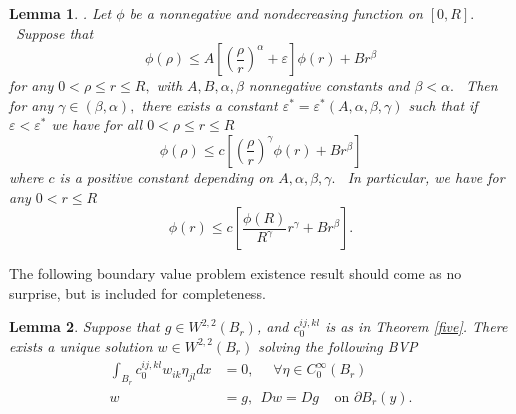 \documentclass[12pt,leqno]{amsart}%
\theoremstyle{plain}
\newtheorem{lemma}{Lemma}[section]
\numberwithin{equation}{section}
\theoremstyle{definition}
\begin{document}
\medskip

\begin{lemma}
\label{HanLin} \cite[Lemma 3.4]{HanLin}. Let $\phi$ be a nonnegative and
nondecreasing function on $[0,R].$ \ Suppose that
\[
\phi(\rho)\leq A\left[  \left(  \frac{\rho}{r}\right)  ^{\alpha}%
+\varepsilon\right]  \phi(r)+Br^{\beta}%
\]
for any $0<\rho\leq r\leq R,$ with $A,B,\alpha,\beta$ nonnegative constants
and $\beta<\alpha.$ \ Then for any $\gamma\in(\beta,\alpha),$ there exists a
constant $\varepsilon^{\ast}=\varepsilon^{\ast}(A,\alpha,\beta,\gamma)$ such
that if $\varepsilon<\varepsilon^{\ast}$ we have for all $0<\rho\leq r\leq R$%
\[
\phi(\rho)\leq c\left[  \left(  \frac{\rho}{r}\right)  ^{\gamma}%
\phi(r)+Br^{\beta}\right]
\]
where $c$ is a positive constant depending on $A,\alpha,\beta,\gamma.$ \ In
particular, we have for any $0<r\leq R$%
\[
\phi(r)\leq c\left[  \frac{\phi(R)}{R^{\gamma}}r^{\gamma}+Br^{\beta}\right]
.
\]

\end{lemma}

The following boundary value problem existence result should come as no
surprise, but is included for completeness.

\begin{lemma}
\label{LM} Suppose that $g\in W^{2,2}(B_{r})$, and $c_{0}^{ij,kl}$ is as in
Theorem \ref{five}. There exists a unique solution $w\in W^{2,2}(B_{r})$
solving the following BVP
\begin{align*}
\int_{B_{r}}c_{0}^{ij,kl}w_{ik}\eta_{jl}dx  &  =0, \ \ \ \text{ $\forall$}\eta\in
C_{0}^{\infty}(B_{r})\\
w  &  =g,\ \ D w=D g\ \ \ \ \ \text{on }\partial B_{r}(y).
\end{align*}

\end{lemma}
\end{document}
